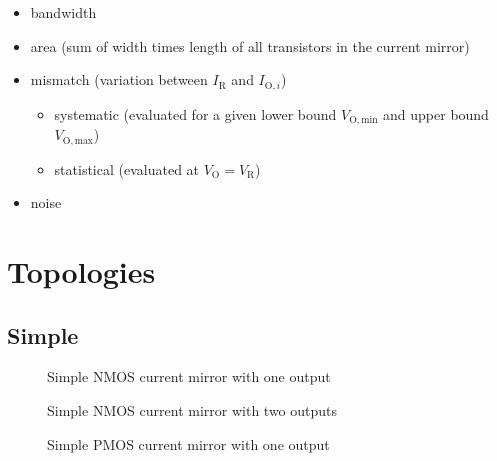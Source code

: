 \documentclass{article}[11pt]
\begin{document}
\begin{itemize}
  \item bandwidth

  \item area (sum of width times length of all transistors in the current mirror)

  \item mismatch (variation between $I_{\mathrm{R}}$ and $I_{\mathrm{O,}i}$)
    \begin{itemize}
      \item[-] systematic 
        (evaluated for a given lower bound 
          $V_{\mathrm{O,min}}$ and upper bound $V_{\mathrm{O,max}}$)
      \item[-] statistical (evaluated at $V_{\mathrm{O}}=V_{\mathrm{R}}$)
    \end{itemize}
  \item noise
\end{itemize}

\section{Topologies}

\subsection{Simple}


\cite[section 4.2.2.2]{gray-anadesic-09}

\begin{figure}[H]
  \centering
  \begin{circuitikz}
    
  \end{circuitikz}
  \caption{Simple NMOS current mirror with one output}
  \label{fig:simple-nmos-1}
\end{figure}

\begin{figure}[H]
  \centering
  \begin{circuitikz}
    
  \end{circuitikz}
  \caption{Simple NMOS current mirror with two outputs}
  \label{fig:simple-nmos-2}
\end{figure}


\begin{figure}[H]
  \centering
  \begin{circuitikz}
    
  \end{circuitikz}
  \caption{Simple PMOS current mirror with one output}
  \label{fig:simple-pmos-1}
\end{figure}
\end{document}
